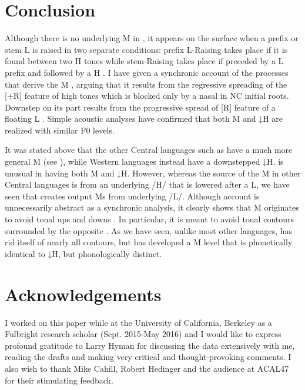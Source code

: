 \documentclass[output=paper,modfonts,nonflat,
 hidelinks
]{langsci/langscibook}
\begin{document}
  
\section{Conclusion}\label{sec:akumbu:6}

Although there is no underlying M  in , it appears on the surface when a prefix or stem L  is raised in two separate conditions: prefix L-Raising takes place if it is found between two H tones while stem-Raising takes place if preceded by a L prefix and followed by a H . I have given a synchronic account of the processes that derive the M , arguing that it results from the regressive spreading of the [+R] feature of high tones which is blocked only by a nasal in NC initial roots. Downstep on its part results from the progressive spread of [\textminus R] feature of a floating L . Simple acoustic analyses have confirmed that both M and ↓H are realized with similar F0 levels.
	
It was stated above that the other Central  languages such as  have a much more general M  (see \citealt{hyman2005}), while Western   languages instead have a downstepped ↓H.  is unusual in having both M and ↓H. However, whereas the source of the M in other Central  languages is from an underlying /H/ that is lowered after a L, we have seen that  creates output Ms from underlying /L/. Although  account is unnecessarily abstract as a synchronic analysis, it clearly shows that M  originates to avoid tonal ups and downs \citep[15]{hyman2010}. In particular, it is meant to avoid tonal contours surrounded by the opposite . As we have seen, unlike most other  languages,  has rid itself of nearly all contours, but has developed a M  level that is phonetically identical to ↓H, but phonologically distinct. 

\section*{Acknowledgements}

I worked on this paper while at the University of California, Berkeley as a Fulbright research scholar (Sept. 2015-May 2016) and I would like to express profound gratitude to Larry Hyman for discussing the data extensively with me, reading the drafts and making very critical and thought-provoking comments. I also wish to thank Mike Cahill, Robert Hedinger and the audience at ACAL47 for their stimulating feedback.
\end{document}
